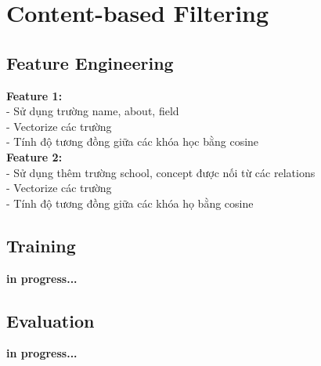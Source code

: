 \section{Content-based Filtering}
\subsection{Feature Engineering}
\textbf{Feature 1:}\\
- Sử dụng trường name, about, field\\
- Vectorize các trường\\
- Tính độ tương đồng giữa các khóa học bằng cosine\\
\textbf{Feature 2:}\\
- Sử dụng thêm trường school, concept được nối từ các relations\\
- Vectorize các trường\\
- Tính độ tương đồng giữa các khóa họ bằng cosine
\subsection{Training}
\textbf{in progress...}
\subsection{Evaluation}
\textbf{in progress...}\\

